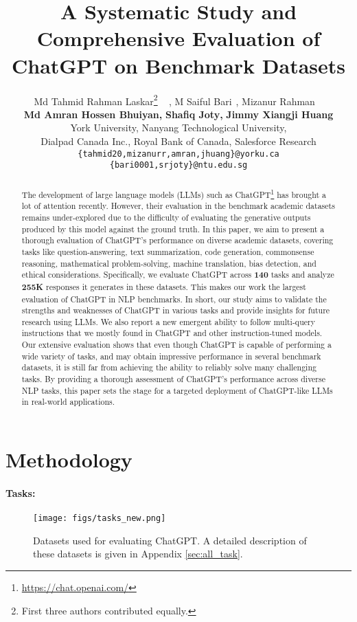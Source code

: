 \documentclass[11pt]{article}
\title{A Systematic Study and Comprehensive Evaluation of ChatGPT on Benchmark Datasets}
\author{Md Tahmid Rahman Laskar\thanks{\hspace{0.115cm} First three authors contributed equally.}\textsuperscript{ \ \textdagger \ \textsection}, M Saiful Bari\textsuperscript{\footnotemark[1] \ \textdaggerdbl}, Mizanur Rahman\textsuperscript{\footnotemark[1] \ \textdagger \ \textparagraph} \\ \textbf{Md Amran Hossen Bhuiyan\textsuperscript{\textdagger},} \textbf{Shafiq Joty\textsuperscript{\textdaggerdbl \textdollar},} \textbf{Jimmy Xiangji Huang\textsuperscript{\textdagger}} \\
          \textsuperscript{\textdagger}York University,
         \textsuperscript{\textdaggerdbl}Nanyang Technological University, \\
          \textsuperscript{\textsection}Dialpad Canada Inc.,
          \textsuperscript{\textparagraph}Royal Bank of Canada,
          \textsuperscript{\textdollar}Salesforce Research
          \\
  \texttt{\{tahmid20,mizanurr,amran,jhuang\}@yorku.ca} \\\texttt{\{bari0001,srjoty\}@ntu.edu.sg}}
\begin{document}
\maketitle
\begin{abstract}

The development of large language models (LLMs) such as ChatGPT\footnote{\url{https://chat.openai.com/}} has brought a lot of attention recently. However, their evaluation in the benchmark academic datasets remains under-explored due to the difficulty of evaluating the generative outputs  produced by this model against the ground truth. In this paper, we aim to present a thorough evaluation of ChatGPT's performance on diverse academic datasets, covering tasks like question-answering, text summarization, code generation, commonsense reasoning, mathematical problem-solving, machine translation, bias detection, and ethical considerations. Specifically, we evaluate ChatGPT across \textbf{140} tasks 
and analyze \textbf{255K} responses it generates in these datasets. This makes our work the largest evaluation of ChatGPT in NLP benchmarks. In short, our study aims to validate the strengths and weaknesses of ChatGPT in various tasks and provide insights for future research using LLMs. We also report a new emergent ability to follow multi-query instructions that we mostly found in ChatGPT and other instruction-tuned models. Our extensive evaluation shows that even though ChatGPT is capable of performing a wide variety of tasks, and may obtain impressive performance in several benchmark datasets, it is still far from achieving the ability to reliably solve many challenging tasks. By providing a thorough assessment of ChatGPT's performance across diverse NLP tasks, this paper sets the stage for a targeted deployment of ChatGPT-like LLMs in real-world applications.

\end{abstract}



\section{Methodology}

\paragraph{Tasks:}

\begin{figure*}
\centering
\texttt{[image: figs/tasks\_new.png]}
\caption{
\small{Datasets used for evaluating ChatGPT. A detailed description of these datasets is given in Appendix \ref{sec:all_task}}.
}
\label{fig:all_tasks}
\vspace{-.5cm}
\end{figure*}
\end{document}
